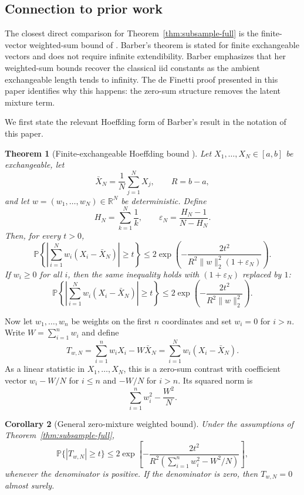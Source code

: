 \documentclass[11pt]{article}
\newcommand{\Pbb}{\mathbb{P}}
\newtheorem{theorem}{Theorem}[section]
\newtheorem{corollary}[theorem]{Corollary}
\theoremstyle{definition}
\theoremstyle{remark}
\begin{document}
\subsection{Connection to prior work}
\label{sec:finite-exch-comparison}

The closest direct comparison for Theorem~\ref{thm:subsample-full} is the finite-vector
weighted-sum bound of \citet{foygel2024hoeffding}. Barber's theorem is stated for finite exchangeable vectors and does not require infinite extendibility. Barber emphasizes that her weighted-sum bounds recover the classical iid constants as the ambient exchangeable length tends to infinity. The de Finetti proof presented in this paper identifies why this happens: the zero-sum structure removes the latent mixture term.

We first state the relevant Hoeffding form of Barber's result in the notation of this paper.

\begin{theorem}[Finite-exchangeable Hoeffding bound \cite{foygel2024hoeffding}]
\label{thm:barber-hoeffding}
Let \(X_1,\ldots,X_N\in[a,b]\) be exchangeable, let
\[
    \bar X_N=\frac1N\sum_{j=1}^N X_j,
    \qquad
    R=b-a,
\]
and let \(w=(w_1,\ldots,w_N)\in\mathbb R^N\) be deterministic.  Define
\[
    H_N=\sum_{k=1}^N\frac1k,
    \qquad
    \varepsilon_N=\frac{H_N-1}{N-H_N}.
\]
Then, for every \(t>0\),
\[
    \Pbb\left\{\left|\sum_{i=1}^N w_i(X_i-\bar X_N)\right|\ge t\right\}
    \le
    2\exp\!\left(
        -\frac{2t^2}{R^2\|w\|_2^2(1+\varepsilon_N)}
    \right).
\]
If \(w_i\ge0\) for all \(i\), then the same inequality holds with
\((1+\varepsilon_N)\) replaced by \(1\):
\[
    \Pbb\left\{
        \left|\sum_{i=1}^N w_i(X_i-\bar X_N)\right|\ge t
    \right\}
    \le
    2\exp\left(
        -\frac{2t^2}{R^2\|w\|_2^2}
    \right).
\]
\end{theorem}


Now let $w_1,\ldots,w_n$ be weights on the first $n$ coordinates and set $w_i=0$ for $i>n$.  Write $W=\sum_{i=1}^n w_i$ and define
\[
    T_{w,N}
    =
    \sum_{i=1}^n w_iX_i
    -
    W\bar X_N
    =
    \sum_{i=1}^N w_i(X_i-\bar X_N).
\]
As a linear statistic in $X_1,\ldots,X_N$, this is a zero-sum contrast with coefficient vector $w_i-W/N$ for $i\le n$ and $-W/N$ for $i>n$.  Its squared norm is
\[
    \sum_{i=1}^n w_i^2-\frac{W^2}{N}.
\]
\begin{corollary}[General zero-mixture weighted bound]\label{cor:weighted}
Under the assumptions of Theorem~\ref{thm:subsample-full},
\[
    \Pbb\{|T_{w,N}|\ge t\}
    \le
    2\exp\!\left[
        -\frac{2t^2}{
        R^2\left(\sum_{i=1}^n w_i^2-W^2/N\right)}
    \right],
\]
whenever the denominator is positive.  If the denominator is zero, then $T_{w,N}=0$ almost surely.
\end{corollary}
\end{document}
